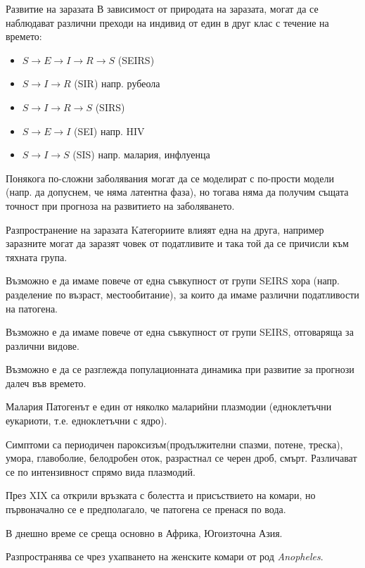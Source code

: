 \begin{frame}[t]{Развитие на заразата}
  В зависимост от природата на заразата, могат да се наблюдават различни преходи на индивид от един в друг клас с течение на времето:
  \begin{itemize}
    \item $S \rightarrow E \rightarrow I \rightarrow R \rightarrow S$ (SEIRS)
    \item $S \rightarrow I \rightarrow R$ (SIR) напр. рубеола
    \item $S \rightarrow I \rightarrow R \rightarrow S$ (SIRS)
    \item $S \rightarrow E \rightarrow I$ (SEI) напр. HIV
    \item $S \rightarrow I \rightarrow S$ (SIS) напр. малария, инфлуенца
  \end{itemize}
  Понякога по-сложни заболявания могат да се моделират с по-прости модели (напр. да допуснем, че няма латентна фаза), но тогава няма да получим същата точност при прогноза на развитието на заболяването.
\end{frame}

\begin{frame}[t]{Разпространение на заразата}
  Kатегориите влияят една на друга, например заразните могат да заразят човек от податливите и така той да се причисли към тяхната група.

  Възможно е да имаме повече от една съвкупност от групи SEIRS хора (напр. разделение по възраст, местообитание), за които да имаме различни податливости на патогена.

  Възможно е да имаме повече от една съвкупност от групи SEIRS, отговаряща за различни видове.

  Възможно е да се разглежда популационната динамика при развитие за прогнози далеч във времето.
\end{frame}

\begin{frame}[t]{Малария}
  Патогенът е един от няколко маларийни плазмодии (едноклетъчни еукариоти, т.е. едноклетъчни с ядро).

  Симптоми са периодичен пароксизъм(продължителни спазми, потене, треска), умора, главоболие, белодробен оток, разрастнал се черен дроб, смърт. Различават се по интензивност спрямо вида плазмодий.

  През XIX са открили връзката с болестта и присъствието на комари, но първоначално се е предполагало, че патогена се пренася по вода.

  В днешно време се среща основно в Африка, Югоизточна Азия.

  Разпространява се чрез ухапването на женските комари от род \textit{Anopheles}.
\end{frame}


